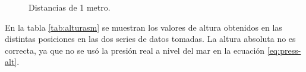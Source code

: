 \documentclass[main]{subfiles}
\begin{document}
\begin{figure}[H]
\hspace{-40pt}
\centering
  \caption{Distancias de 1 metro.}
\label{fig:1m}
\end{figure}

En la tabla \ref{tab:alturasm} se muestran los valores de altura obtenidos en las distintas posiciones en las dos series de datos tomadas. La altura absoluta no es correcta, ya que no se us\'o la presi\'on real a nivel del mar en la ecuaci\'on \ref{eq:press-alt}.
\end{document}
